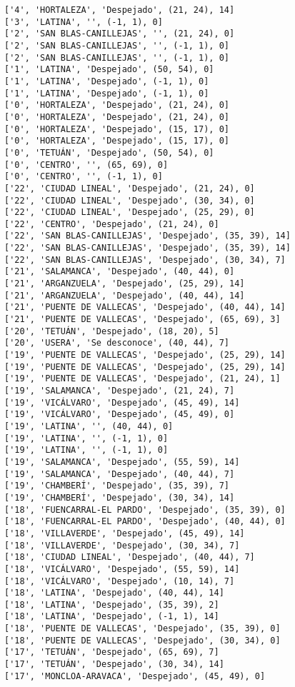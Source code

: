 \documentclass[11pt]{article}
\begin{document}
\begin{Verbatim}[commandchars=\\\{\}]
['4', 'HORTALEZA', 'Despejado', (21, 24), 14]
['3', 'LATINA', '', (-1, 1), 0]
['2', 'SAN BLAS-CANILLEJAS', '', (21, 24), 0]
['2', 'SAN BLAS-CANILLEJAS', '', (-1, 1), 0]
['2', 'SAN BLAS-CANILLEJAS', '', (-1, 1), 0]
['1', 'LATINA', 'Despejado', (50, 54), 0]
['1', 'LATINA', 'Despejado', (-1, 1), 0]
['1', 'LATINA', 'Despejado', (-1, 1), 0]
['0', 'HORTALEZA', 'Despejado', (21, 24), 0]
['0', 'HORTALEZA', 'Despejado', (21, 24), 0]
['0', 'HORTALEZA', 'Despejado', (15, 17), 0]
['0', 'HORTALEZA', 'Despejado', (15, 17), 0]
['0', 'TETUÁN', 'Despejado', (50, 54), 0]
['0', 'CENTRO', '', (65, 69), 0]
['0', 'CENTRO', '', (-1, 1), 0]
['22', 'CIUDAD LINEAL', 'Despejado', (21, 24), 0]
['22', 'CIUDAD LINEAL', 'Despejado', (30, 34), 0]
['22', 'CIUDAD LINEAL', 'Despejado', (25, 29), 0]
['22', 'CENTRO', 'Despejado', (21, 24), 0]
['22', 'SAN BLAS-CANILLEJAS', 'Despejado', (35, 39), 14]
['22', 'SAN BLAS-CANILLEJAS', 'Despejado', (35, 39), 14]
['22', 'SAN BLAS-CANILLEJAS', 'Despejado', (30, 34), 7]
['21', 'SALAMANCA', 'Despejado', (40, 44), 0]
['21', 'ARGANZUELA', 'Despejado', (25, 29), 14]
['21', 'ARGANZUELA', 'Despejado', (40, 44), 14]
['21', 'PUENTE DE VALLECAS', 'Despejado', (40, 44), 14]
['21', 'PUENTE DE VALLECAS', 'Despejado', (65, 69), 3]
['20', 'TETUÁN', 'Despejado', (18, 20), 5]
['20', 'USERA', 'Se desconoce', (40, 44), 7]
['19', 'PUENTE DE VALLECAS', 'Despejado', (25, 29), 14]
['19', 'PUENTE DE VALLECAS', 'Despejado', (25, 29), 14]
['19', 'PUENTE DE VALLECAS', 'Despejado', (21, 24), 1]
['19', 'SALAMANCA', 'Despejado', (21, 24), 7]
['19', 'VICÁLVARO', 'Despejado', (45, 49), 14]
['19', 'VICÁLVARO', 'Despejado', (45, 49), 0]
['19', 'LATINA', '', (40, 44), 0]
['19', 'LATINA', '', (-1, 1), 0]
['19', 'LATINA', '', (-1, 1), 0]
['19', 'SALAMANCA', 'Despejado', (55, 59), 14]
['19', 'SALAMANCA', 'Despejado', (40, 44), 7]
['19', 'CHAMBERÍ', 'Despejado', (35, 39), 7]
['19', 'CHAMBERÍ', 'Despejado', (30, 34), 14]
['18', 'FUENCARRAL-EL PARDO', 'Despejado', (35, 39), 0]
['18', 'FUENCARRAL-EL PARDO', 'Despejado', (40, 44), 0]
['18', 'VILLAVERDE', 'Despejado', (45, 49), 14]
['18', 'VILLAVERDE', 'Despejado', (30, 34), 7]
['18', 'CIUDAD LINEAL', 'Despejado', (40, 44), 7]
['18', 'VICÁLVARO', 'Despejado', (55, 59), 14]
['18', 'VICÁLVARO', 'Despejado', (10, 14), 7]
['18', 'LATINA', 'Despejado', (40, 44), 14]
['18', 'LATINA', 'Despejado', (35, 39), 2]
['18', 'LATINA', 'Despejado', (-1, 1), 14]
['18', 'PUENTE DE VALLECAS', 'Despejado', (35, 39), 0]
['18', 'PUENTE DE VALLECAS', 'Despejado', (30, 34), 0]
['17', 'TETUÁN', 'Despejado', (65, 69), 7]
['17', 'TETUÁN', 'Despejado', (30, 34), 14]
['17', 'MONCLOA-ARAVACA', 'Despejado', (45, 49), 0]

\end{Verbatim}
\end{document}
